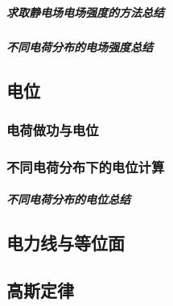 \documentclass[UTF8]{article} %
\begin{document}
\subparagraph{求取静电场电场强度的方法总结}

\subparagraph{不同电荷分布的电场强度总结}


\subsection{电位}
\subsubsection{电荷做功与电位}

\subsubsection{不同电荷分布下的电位计算}

\subparagraph{不同电荷分布的电位总结}


\subsection{电力线与等位面}

\subsection{高斯定律}
\end{document}

